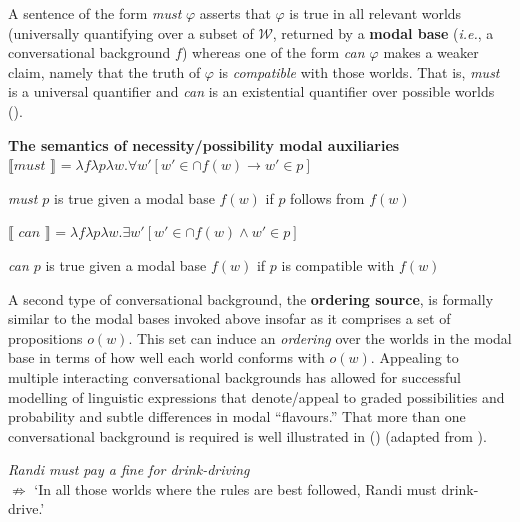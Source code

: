 \documentclass[12pt,dvipsnames]{report}
\providecommand{\denote}[2][]{\ensuremath{\llbracket{#2}\rrbracket^{#1}}}
\begin{document}
 A sentence of the form \textit{must} $ \varphi $ asserts that $ \varphi $ is true in all relevant worlds (universally quantifying over a subset of $ \mathcal W $, returned by a \textbf{modal base} (\textit{i.e.}, a conversational background $ f $) whereas one of the form \textit{can $ \varphi $} makes a weaker claim, namely that the truth of $ \varphi $ is \textit{compatible} with those worlds. That is, \textit{must} is a universal quantifier and \textit{can} is an existential quantifier over possible worlds (\nextx). %

\pex\textbf{ The semantics of necessity/possibility modal auxiliaries }
\a $ \denote{\textit{must~}}=\lambda f\lambda p\lambda w.\forall w'[w'\in\cap f(w)\to w'\in p] $

\textit{must $ p $} is true given a modal base $ f(w) $ if $ p $ follows from $ f(w) $


\a $ \denote{\textit{~can~}}=\lambda f\lambda p\lambda w.\exists w'[w'\in\cap f(w)\wedge w'\in p] $

\textit{can $ p $} is true given a modal base $ f(w) $ if $ p $ is compatible with $ f(w) $

\xe

A second type of conversational background, the \textbf{ordering source}, is formally similar to the modal bases invoked above insofar as it comprises a set of propositions $ o(w) $. This set can induce an \textit{ordering} over the worlds in the modal base in terms of how well each world conforms with $ o(w) $. Appealing to multiple interacting conversational backgrounds has allowed for successful modelling of linguistic expressions that denote/appeal to graded possibilities and probability and subtle differences in modal ``flavours.'' That more than one conversational background is required is well illustrated in (\nextx) (adapted from \citealp*{Kaufmann2006}).

\pex \textit{Randi must pay a fine for drink-driving}\\ $ \boldsymbol{\not\Rightarrow }$ `In all those worlds where the rules are best followed, Randi must drink-drive.'\label{ex:randi}\xe
\end{document}
